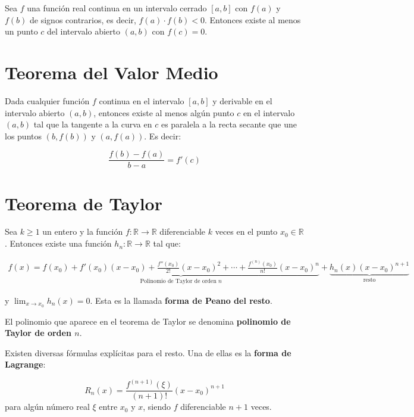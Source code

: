 \documentclass[openany]{book}
\begin{document}
Sea \(f\) una función real continua en un intervalo cerrado \([a,b]\) con \(f(a)\) y \(f(b)\) de signos contrarios, es decir, \(f(a)\cdot f(b) < 0\). Entonces existe al menos un punto \(c\) del intervalo abierto \((a, b)\) con \(f(c) = 0\).

\hypertarget{teorema-del-valor-medio}{%
\section*{Teorema del Valor Medio}\label{teorema-del-valor-medio}}

Dada cualquier función \(f\) continua en el intervalo \([a, b]\) y derivable en el intervalo abierto \((a, b)\), entonces existe al menos algún punto \(c\) en el intervalo \((a, b)\) tal que la tangente a la curva en \(c\) es paralela a la recta secante que une los puntos \((b, f(b))\) y \((a, f(a))\). Es decir:

\[
{\displaystyle {\frac {f(b)-f(a)}{b-a}}=f'(c)} 
\]

\hypertarget{teorema-de-taylor}{%
\section*{Teorema de Taylor}\label{teorema-de-taylor}}

Sea \(k \geq 1\) un entero y la función \(f:\mathbb{R} \rightarrow \mathbb{R}\) diferenciable \(k\) veces en el punto \(x_0 \in \mathbb{R}\). Entonces existe una función \(h_n: \mathbb{R} \rightarrow \mathbb{R}\) tal que:

\begin{gather*}
f(x) =
\underbrace{f(x_0) + f'(x_0)(x-x_0) + {\frac{f''(x_0)}{2!}} (x-x_0)^{2} + \cdots + {\frac{f^{(n)}(x_0)}{n!}}(x-x_0)^{n}}_{\text{Polinomio de Taylor de orden $n$}} + 
\underbrace{h_{n}(x)(x-x_0)^{n+1}}_{\text{resto}}
\end{gather*}

y \(\lim_{x \to x_0} h_n(x)=0\). Esta es la llamada \textbf{forma de Peano del resto}.

El polinomio que aparece en el teorema de Taylor se denomina \textbf{polinomio de Taylor de orden \(n\)}.

Existen diversas fórmulas explícitas para el resto. Una de ellas es la \textbf{forma de Lagrange}:

\[ R_{n}(x) = {\frac {f^{(n+1)}(\xi)}{(n+1)!}}(x-x_0)^{n+1} \]
para algún número real \(\xi\) entre \(x_0\) y \(x\), siendo \(f\) diferenciable \(n+1\) veces.
\end{document}
